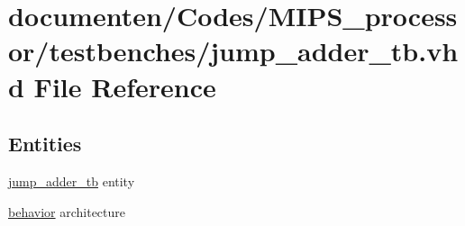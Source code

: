 \hypertarget{jump__adder__tb_8vhd}{\section{documenten/\-Codes/\-M\-I\-P\-S\-\_\-processor/testbenches/jump\-\_\-adder\-\_\-tb.vhd File Reference}
\label{jump__adder__tb_8vhd}
}
\subsection*{Entities}
\begin{DoxyCompactItemize}
\item 
\hyperlink{classjump__adder__tb}{jump\-\_\-adder\-\_\-tb} entity
\item 
\hyperlink{classjump__adder__tb_1_1behavior}{behavior} architecture
\end{DoxyCompactItemize}
